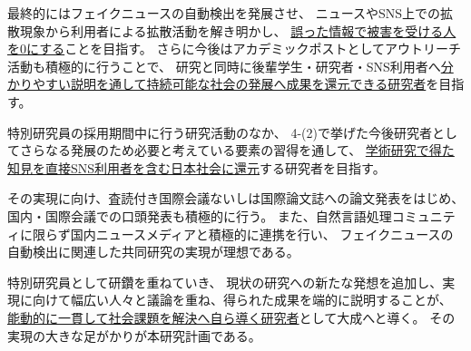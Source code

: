 \begin{spacing}{1.08}
最終的にはフェイクニュースの自動検出を発展させ、
ニュースやSNS上での拡散現象から利用者による拡散活動を解き明かし、
\underline{誤った情報で被害を受ける人を0にする}ことを目指す。
さらに今後はアカデミックポストとしてアウトリーチ活動も積極的に行うことで、
研究と同時に後輩学生・研究者・SNS利用者へ\underline{分かりやすい説明を通して持続可能な社会の発展へ成果を還元できる研究者}を目指す。


\vspace{5mm}
\noindent
{}

特別研究員の採用期間中に行う研究活動のなか、
4-(2)で挙げた今後研究者としてさらなる発展のため必要と考えている要素の習得を通して、
\underline{学術研究で得た知見を直接SNS利用者を含む日本社会に還元}する研究者を目指す。

その実現に向け、査読付き国際会議ないしは国際論文誌への論文発表をはじめ、
国内・国際会議での口頭発表も積極的に行う。
また、自然言語処理コミュニティに限らず国内ニュースメディアと積極的に連携を行い、
フェイクニュースの自動検出に関連した共同研究の実現が理想である。

特別研究員として研鑽を重ねていき、
現状の研究への新たな発想を追加し、実現に向けて幅広い人々と議論を重ね、得られた成果を端的に説明することが、
\underline{能動的に一貫して社会課題を解決へ自ら導く研究者}として大成へと導く。
その実現の大きな足がかりが本研究計画である。
\end{spacing}


